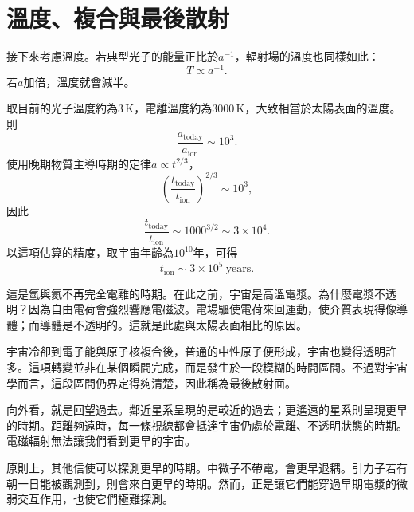 \begin{classroomqa}
\end{classroomqa}

\section{溫度、複合與最後散射}

接下來考慮溫度。若典型光子的能量正比於\(a^{-1}\)，輻射場的溫度也同樣如此：
\begin{equation}
T\propto a^{-1}.
\end{equation}
若\(a\)加倍，溫度就會減半。

取目前的光子溫度約為\(3\,\mathrm K\)，電離溫度約為\(3000\,\mathrm K\)，大致相當於太陽表面的溫度。則
\begin{equation}
\frac{a_{\mathrm{today}}}{a_{\mathrm{ion}}}\sim 10^3.
\end{equation}
使用晚期物質主導時期的定律\(a\propto t^{2/3}\)，
\begin{equation}
\left(\frac{t_{\mathrm{today}}}{t_{\mathrm{ion}}}\right)^{2/3}\sim 10^3,
\end{equation}
因此
\begin{equation}
\frac{t_{\mathrm{today}}}{t_{\mathrm{ion}}}\sim 1000^{3/2}\sim 3\times 10^4.
\end{equation}
以這項估算的精度，取宇宙年齡為\(10^{10}\)年，可得
\begin{equation}
t_{\mathrm{ion}}\sim 3\times 10^5\ \mathrm{years}.
\end{equation}

這是氫與氦不再完全電離的時期。在此之前，宇宙是高溫電漿。為什麼電漿不透明？因為自由電荷會強烈響應電磁波。電場驅使電荷來回運動，使介質表現得像導體；而導體是不透明的。這就是此處與太陽表面相比的原因。

宇宙冷卻到電子能與原子核複合後，普通的中性原子便形成，宇宙也變得透明許多。這項轉變並非在某個瞬間完成，而是發生於一段模糊的時間區間。不過對宇宙學而言，這段區間仍界定得夠清楚，因此稱為最後散射面。

向外看，就是回望過去。鄰近星系呈現的是較近的過去；更遙遠的星系則呈現更早的時期。距離夠遠時，每一條視線都會抵達宇宙仍處於電離、不透明狀態的時期。電磁輻射無法讓我們看到更早的宇宙。

原則上，其他信使可以探測更早的時期。中微子不帶電，會更早退耦。引力子若有朝一日能被觀測到，則會來自更早的時期。然而，正是讓它們能穿過早期電漿的微弱交互作用，也使它們極難探測。

